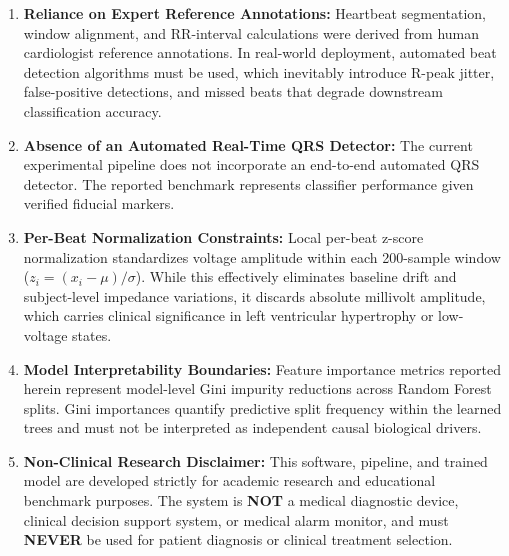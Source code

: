 \documentclass[conference]{IEEEtran}
\begin{document}
\begin{enumerate}
    \item \textbf{Reliance on Expert Reference Annotations:} Heartbeat segmentation, window alignment, and RR-interval calculations were derived from human cardiologist reference annotations. In real-world deployment, automated beat detection algorithms must be used, which inevitably introduce R-peak jitter, false-positive detections, and missed beats that degrade downstream classification accuracy.
    \item \textbf{Absence of an Automated Real-Time QRS Detector:} The current experimental pipeline does not incorporate an end-to-end automated QRS detector. The reported benchmark represents classifier performance given verified fiducial markers.
    \item \textbf{Per-Beat Normalization Constraints:} Local per-beat z-score normalization standardizes voltage amplitude within each 200-sample window ($z_i = (x_i - \mu)/\sigma$). While this effectively eliminates baseline drift and subject-level impedance variations, it discards absolute millivolt amplitude, which carries clinical significance in left ventricular hypertrophy or low-voltage states.
    \item \textbf{Model Interpretability Boundaries:} Feature importance metrics reported herein represent model-level Gini impurity reductions across Random Forest splits. Gini importances quantify predictive split frequency within the learned trees and must not be interpreted as independent causal biological drivers.
    \item \textbf{Non-Clinical Research Disclaimer:} This software, pipeline, and trained model are developed strictly for academic research and educational benchmark purposes. The system is \textbf{NOT} a medical diagnostic device, clinical decision support system, or medical alarm monitor, and must \textbf{NEVER} be used for patient diagnosis or clinical treatment selection.
\end{enumerate}
\end{document}
